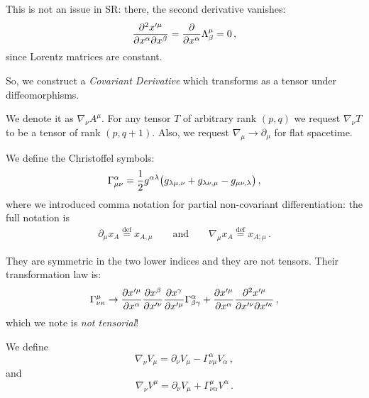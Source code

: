 \documentclass[main.tex]{subfiles}
\begin{document}
This is not an issue in SR: there, the second derivative vanishes:
%
\begin{equation}
    \pdv[2]{x^{\prime \mu }}{x^{\alpha }}{x^{\beta }}
    = \pdv{}{x^{\alpha }} \Lambda^{\mu }_{\beta } = 0 
\,,
\end{equation}
%
since Lorentz matrices are constant.

So, we construct a \emph{Covariant Derivative} which transforms as a tensor under diffeomorphisms.

We denote it as \(\nabla_\nu A^{\mu }\).
For any tensor \(T\) of arbitrary rank \((p, q)\) we request \(\nabla_\nu T\) to be a tensor of rank \((p, q+1)\).
Also, we request \(\nabla_\mu \rightarrow \partial_\mu\) for flat spacetime.

We define the Christoffel symbols: 
%
\begin{equation}
  \Gamma_{\mu \nu }^{\alpha } =
  \frac{1}{2} g^{\alpha \lambda } \qty(g_{\lambda \mu , \nu }+ g_{\lambda \nu , \mu } - g_{\mu \nu , \lambda })
\,,
\end{equation}
%
where we introduced comma notation for partial non-covariant differentiation: the full notation is 
%
\begin{align}
\partial_{\mu } x_{A} \overset{\text{def}}{=}  x_{A, \mu } 
\qquad \text{and} \qquad
\nabla_{\mu } x_{A} \overset{\text{def}}{=} x_{A;\mu }
\,.
\end{align}
%

They are symmetric in the two lower indices and they are not tensors. Their transformation law is: 
%
\begin{equation}
  \Gamma_{\nu \kappa }^{\mu }\rightarrow
  \pdv{x^{\prime \mu }}{x^{\alpha }} \pdv{x^{\beta }}{x^{\prime \nu }} \pdv{x^{\gamma }}{x^{\prime \mu }} \Gamma^{\alpha }_{\beta \gamma } + 
  \pdv{x^{\prime \mu }}{x^{\alpha }} \pdv[2]{x^{\prime \mu }}{x^{\prime \nu }}{x^{\prime \kappa }}  
\,,
\end{equation}
%
which we note is \emph{not tensorial}!

We define 
%
\begin{equation}
    \nabla_{\nu }V_{\mu } = \partial_{\nu } V_\mu - \Gamma_{\nu \mu }^{\alpha } V_{\alpha }
\,,
\end{equation}
%
and 
%
\begin{equation}
    \nabla_{\nu }V^{\mu} = \partial_{\nu } V_\mu + \Gamma_{\nu \alpha  }^{\mu  } V^{\alpha }
\,.
\end{equation}
%
\end{document}
